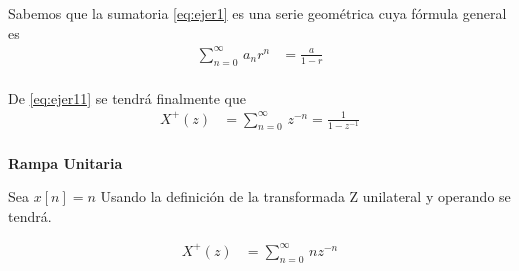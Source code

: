 \documentclass[12pt]{article}
\begin{document}
Sabemos que la sumatoria \ref{eq:ejer1} es una serie geométrica cuya fórmula general es
\begin{equation}
    \begin{split}
        \displaystyle\sum_{n=0}^{\infty}\,a_{n}r^{n}&=\frac{a}{1-r}\\
    \end{split}
    \label{eq:ejer11}
\end{equation}

De \ref{eq:ejer11} se tendrá finalmente que 
\begin{equation}
    \begin{split}
        X^+(z)&=\displaystyle\sum_{n=0}^{\infty}\,z^{-n}=\frac{1}{1-z^{-1}}\\
    \end{split}
    \label{eq:ejer12}
\end{equation}

\textbf{Rampa Unitaria}
\vspace{5mm}

Sea $x[n]=n$
Usando la definición de la transformada Z unilateral y operando se tendrá.

\begin{equation}
    \begin{split}
        X^+(z)&=\displaystyle\sum_{n=0}^{\infty}\,nz^{-n}\\
    \end{split}
    \label{eq:ejer2}
\end{equation}



\end{document}
